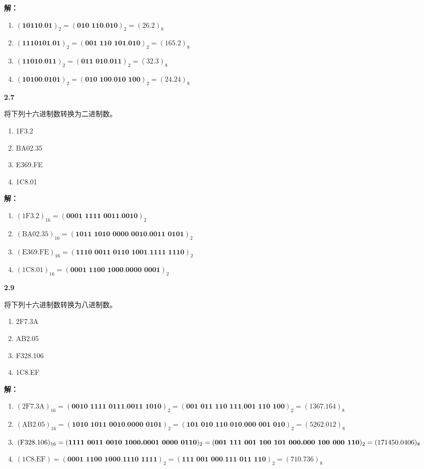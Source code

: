 \documentclass[10pt, a4paper]{article}
\newcommand{\question}[2]{
    \vspace{2ex}\noindent\textbf{#1}\ {\kaishu #2} \par\vspace{1ex}
}
\newcommand{\solution}[1]{
    \noindent\textbf{解：}{\songti #1} \par\vspace{3ex}
}
\begin{document}
\solution{
\begin{enumerate}
	\item $ (\textbf{10110.01})_2 = (\textbf{010\ 110.010})_2 = (26.2)_8 $
    \item $ (\textbf{1110101.01})_2 = (\textbf{001\ 110\ 101.010})_2 = (165.2)_8 $
    \item $ (\textbf{11010.011})_2 = (\textbf{011\ 010.011})_2 = (32.3)_8 $
    \item $ (\textbf{10100.0101})_2 = (\textbf{010\ 100.010\ 100})_2 = (24.24)_8$
\end{enumerate}
}

\question{2.7}{
将下列十六进制数转换为二进制数。
\begin{enumerate}
	\item 1F3.2
	\item BA02.35
	\item E369.FE
	\item 1C8.01
\end{enumerate}
}

\solution{
\begin{enumerate}
    \item $ (\mathrm{1F3.2})_{16} = (\textbf{0001\ 1111\ 0011.0010})_2 $
    \item $ (\mathrm{BA02.35})_{16} = (\textbf{1011\ 1010\ 0000\ 0010.0011\ 0101})_2 $
    \item $ (\mathrm{E369.FE})_{16} = (\textbf{1110\ 0011\ 0110\ 1001.1111\ 1110})_2 $
    \item $ (\mathrm{1C8.01})_{16} = (\textbf{0001\ 1100\ 1000.0000\ 0001})_2 $
\end{enumerate}
}

\question{2.9}{
将下列十六进制数转换为八进制数。
\begin{enumerate}
    \item 2F7.3A
    \item AB2.05
    \item F328.106
    \item 1C8.EF
\end{enumerate}
}

\solution{
\begin{enumerate}
    \item $ (\mathrm{2F7.3A})_{16} = (\textbf{0010\ 1111\ 0111.0011\ 1010})_2 = (\textbf{001\ 011\ 110\ 111.001\ 110\ 100})_2 = (1367.164)_8 $
    \item $ (\mathrm{AB2.05})_{16} = (\textbf{1010\ 1011\ 0010.0000\ 0101})_2 = (\textbf{101\ 010\ 110\ 010.000\ 001\ 010})_2 = (5262.012)_8 $
    \item $ (\mathrm{F328.106})_{16} = (\textbf{1111\ 0011\ 0010\ 1000.0001\ 0000\ 0110})_2 \\ = (\textbf{001\ 111\ 001\ 100\ 101\ 000.000\ 100\ 000\ 110})_2 = (171450.0406)_8 $
    \item $ (\mathrm{1C8.EF}) = (\textbf{0001\ 1100\ 1000.1110\ 1111})_2 = (\textbf{111\ 001\ 000.111\ 011\ 110})_2 = (710.736)_8 $
\end{enumerate}
}
\end{document}
